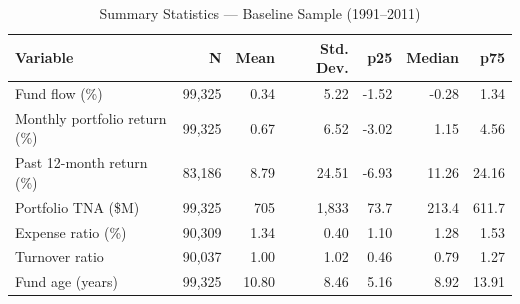 \documentclass{article}
\begin{document}
\begin{table}[htbp]
\centering
\caption{Summary Statistics --- Baseline Sample (1991--2011)}
\label{tab:summary-stats-baseline}
\small
\begin{tabularx}{\textwidth}{Xrrrrrr}
\toprule
Variable & N & Mean & Std. Dev. & p25 & Median & p75 \\
\midrule
Fund flow (\%) & 99,325 & 0.34 & 5.22 & -1.52 & -0.28 & 1.34 \\
Monthly portfolio return (\%) & 99,325 & 0.67 & 6.52 & -3.02 & 1.15 & 4.56 \\
Past 12-month return (\%) & 83,186 & 8.79 & 24.51 & -6.93 & 11.26 & 24.16 \\
Portfolio TNA (\$M) & 99,325 & 705 & 1,833 & 73.7 & 213.4 & 611.7 \\
Expense ratio (\%) & 90,309 & 1.34 & 0.40 & 1.10 & 1.28 & 1.53 \\
Turnover ratio & 90,037 & 1.00 & 1.02 & 0.46 & 0.79 & 1.27 \\
Fund age (years) & 99,325 & 10.80 & 8.46 & 5.16 & 8.92 & 13.91 \\
\bottomrule
\end{tabularx}
\end{table}

\end{document}
